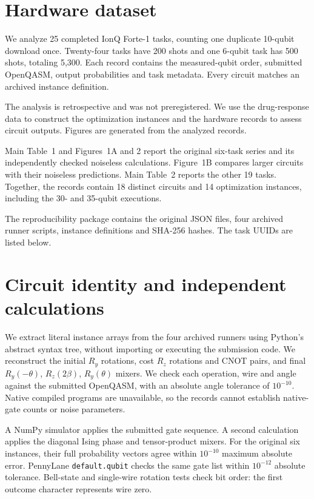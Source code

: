 \documentclass[utf8]{frontiers_suppmat}
\begin{document}
\onecolumn
{}
\title[Supplementary Material]{{}}
{\setlength{\parindent}{0pt}\maketitle}

\section{Hardware dataset}
We analyze 25 completed IonQ Forte-1 tasks, counting one duplicate 10-qubit download once. Twenty-four tasks have 200 shots and one 6-qubit task has 500 shots, totaling 5,300. Each record contains the measured-qubit order, submitted OpenQASM, output probabilities and task metadata. Every circuit matches an archived instance definition.

The analysis is retrospective and was not preregistered. We use the drug-response data to construct the optimization instances and the hardware records to assess circuit outputs. Figures are generated from the analyzed records.

Main Table~1 and Figures~1A and 2 report the original six-task series and its independently checked noiseless calculations. Figure~1B compares larger circuits with their noiseless predictions. Main Table~2 reports the other 19 tasks. Together, the records contain 18 distinct circuits and 14 optimization instances, including the 30- and 35-qubit executions.

The reproducibility package contains the original JSON files, four archived runner scripts, instance definitions and SHA-256 hashes. The task UUIDs are listed below.

\section{Circuit identity and independent calculations}
We extract literal instance arrays from the four archived runners using Python's abstract syntax tree, without importing or executing the submission code. We reconstruct the initial $R_y$ rotations, cost $R_z$ rotations and CNOT pairs, and final $R_y(-\theta)$, $R_z(2\beta)$, $R_y(\theta)$ mixers. We check each operation, wire and angle against the submitted OpenQASM, with an absolute angle tolerance of $10^{-10}$. Native compiled programs are unavailable, so the records cannot establish native-gate counts or noise parameters.

A NumPy simulator applies the submitted gate sequence. A second calculation applies the diagonal Ising phase and tensor-product mixers. For the original six instances, their full probability vectors agree within $10^{-10}$ maximum absolute error. PennyLane \texttt{default.qubit} checks the same gate list within $10^{-12}$ absolute tolerance. Bell-state and single-wire rotation tests check bit order: the first outcome character represents wire zero.
\end{document}
